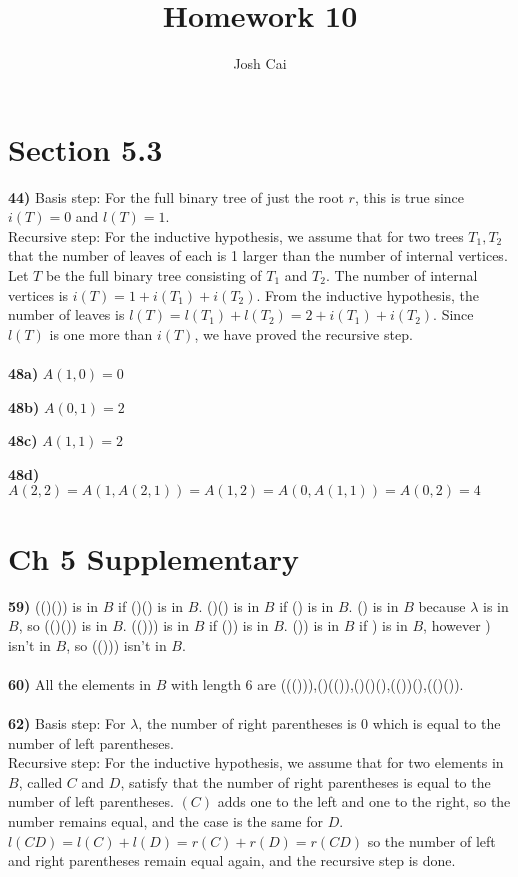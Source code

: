 \documentclass{article}
\begin{document}
\title{Homework 10}
\author{Josh Cai}

\maketitle
\section*{Section 5.3}

\textbf{44)} Basis step: For the full binary tree of just the root $r$, this is true since $i(T)=0$ and $l(T)=1$. 
\\Recursive step: For the inductive hypothesis, we assume that for two trees $T_1, T_2$ that the number of leaves of each is 1 larger than the number of internal vertices. Let $T$ be the full binary tree consisting of $T_1$ and $T_2$. The number of internal vertices is $i(T) = 1+i(T_1)+i(T_2)$. From the inductive hypothesis, the number of leaves is $l(T) = l(T_1) + l(T_2) = 2+i(T_1)+i(T_2)$. Since $l(T)$ is one more than $i(T)$, we have proved the recursive step.
\\\\\noindent\textbf{48a)} $A(1,0) = 0$

\noindent\textbf{48b)} $A(0,1) = 2$

\noindent\textbf{48c)} $A(1,1) = 2$

\noindent\textbf{48d)} $A(2,2) = A(1,A(2,1)) = A(1,2) = A(0,A(1,1)) = A(0,2) = 4$

\section*{Ch 5 Supplementary}

\noindent\textbf{59)} (()()) is in $B$ if ()() is in $B$. ()() is in $B$ if () is in $B$. () is in $B$ because $\lambda$ is in $B$, so (()()) is in $B$. (())) is in $B$ if ()) is in $B$. ()) is in $B$ if ) is in $B$, however ) isn't in $B$, so (())) isn't in $B$.
\\\\\noindent\textbf{60)} All the elements in $B$ with length 6 are ((())),()(()),()()(),(())(),(()()).
\\\\\noindent\textbf{62)} Basis step: For $\lambda$, the number of right parentheses is 0 which is equal to the number of left parentheses.
\\Recursive step: For the inductive hypothesis, we assume that for two elements in $B$, called $C$ and $D$, satisfy that the number of right parentheses is equal to the number of left parentheses. $(C)$ adds one to the left and one to the right, so the number remains equal, and the case is the same for $D$. $l(CD) = l(C)+l(D) = r(C)+r(D) = r(CD)$ so the number of left and right parentheses remain equal again, and the recursive step is done.
\end{document}
